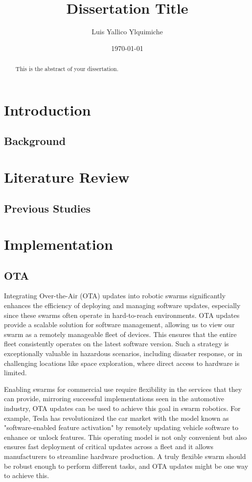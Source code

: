 \documentclass{report}
\title{Dissertation Title}
\author{Luis Yallico Ylquimiche}
\date{\today}
\begin{document}
\maketitle

\begin{abstract}
This is the abstract of your dissertation.
\end{abstract}

\tableofcontents

\chapter{Introduction}
\section{Background}
\lipsum[1-2] %

\chapter{Literature Review}
\section{Previous Studies}
\lipsum[3-4] %

\chapter{Implementation}
\section{OTA}

Integrating Over-the-Air (OTA) updates into robotic swarms significantly enhances the efficiency of deploying and managing software updates, especially since these swarms often operate in hard-to-reach environments. OTA updates provide a scalable solution for software management, allowing us to view our swarm as a remotely manageable fleet of devices. This ensures that the entire fleet consistently operates on the latest software version. Such a strategy is exceptionally valuable in hazardous scenarios, including disaster response, or in challenging locations like space exploration, where direct access to hardware is limited. %

Enabling swarms for commercial use require flexibility in the services that they can provide, mirroring successful implementations seen in the automotive industry, OTA updates can be used to achieve this goal in swarm robotics. For example, Tesla has revolutionized the car market with the model known as "software-enabled feature activation" by remotely updating vehicle software to enhance or unlock features. This operating model is not only convenient but also ensures fast deployment of critical updates across a fleet and it allows manufacturers to streamline hardware production. A truly flexible swarm should be robust enough to perform different tasks, and OTA updates might be one way to achieve this. %
\end{document}

